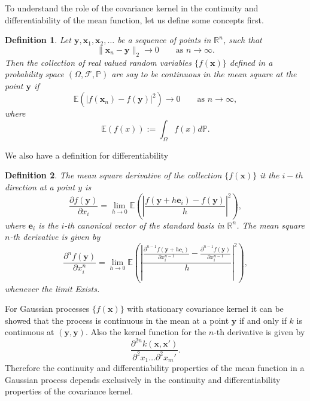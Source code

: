 \documentclass[12pt]{book}
\newtheorem{definition}{Definition}
\newcommand{\p}{\mathbb{P}}
\newcommand{\E}{\mathbb{E}} %
\newcommand{\x}{\textbf{x}}
\newcommand{\y}{\textbf{y}}
\begin{document}
To understand the role of the covariance kernel in the continuity and differentiability
 of the mean function, let us
define some concepts first. 
\begin{definition}
Let $\y,\x_{1},\x_{2},\ldots$ be a sequence of points in $\mathbb{R}^{n}$, such that 
\begin{equation*}
\|\x_{n}-\y\|_{2}\rightarrow 0\qquad\text{as }n\rightarrow\infty.
\end{equation*}
Then the collection of real valued random variables $\{f(\x)\}$ defined in a probability space
$(\Omega,\mathscr{F},\p)$ are say to be continuous in the mean
square at the point $\y$ if 
\begin{equation*}
\E(|f(\x_{n})-f(\y)|^{2})\rightarrow 0\qquad\text{as } n\rightarrow\infty,
\end{equation*}
where
\begin{equation*}
\E(f(x)):=\int_{\Omega}f(x)d\p.
\end{equation*}
\end{definition}
We also have a definition for differentiability
\begin{definition}
The mean square derivative of the  collection $\{f(\x)\}$  it the $i-th$ direction  at a point $y$ is
\begin{equation*}
\frac{\partial f(\y)}{\partial x_{i}}=
\lim_{h\rightarrow 0}\E\left(\left|\frac{f(\y+h\textbf{e}_{i})-f(\y)}{h}\right|^{2}\right),
\end{equation*}
where $\textbf{e}_{i}$ is the $i$-th canonical vector of the standard basis in $\mathbb{R}^{n}$.
The mean square $n$-th derivative is given by 
\begin{equation*}
\frac{\partial^{n} f(\y)}{\partial x_{i}^{n}}=
\lim_{h\rightarrow 0}\E\left(\left|\frac{\frac{\partial^{n-1}f(\y+h\textbf{e}_{i})}{\partial x_{i}^{n-1}}-
\frac{\partial^{n-1}f(\y)}{\partial x_{i}^{n-1}}}{h}\right|^{2}\right),
\end{equation*}
whenever the limit Exists.
\end{definition}


For Gaussian processes $\{f(\x)\}$ with stationary covariance kernel it can be showed that 
the process is continuous in the mean at a point $\y$ if and only if $k$ is continuous at $(\y,\y)$. 
Also the kernel function for the $n$-th derivative is given by \cite{adlergeometry}
\begin{equation*}
\frac{\partial^{2n}k(\x,\x')}{\partial^{2}x_{1}\ldots\partial^{2}x_{m}'}.
\end{equation*}
Therefore the continuity and differentiability properties of the mean function in a Gaussian process
depends exclusively in the continuity and differentiability properties of the covariance kernel.
\end{document}
